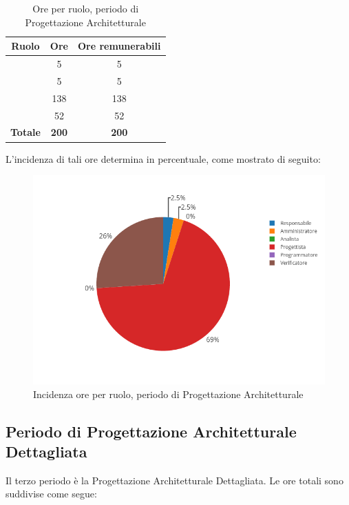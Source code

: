 \begin{table}[H]
	\begin{center}
		\begin{tabular}{|c|c|c|}
			\hline
			\textbf{Ruolo}	& \textbf{Ore}	& \textbf{Ore remunerabili} \\
			\hline
			\Res	&	5	&	5	\\
			\hline
			\Amm	&	5	&	5	\\
			\hline
			\Prog   &	138   &	138	\\
			\hline
			\Ver	&	52	&	52	\\
			\hline
			\textbf{Totale} & \textbf{200} & \textbf{200} \\
			\hline
		\end{tabular}
	\end{center}
	\caption{Ore per ruolo, periodo di Progettazione Architetturale}
\end{table}

L'incidenza di tali ore determina in percentuale, come mostrato di seguito:
\begin{figure}[H]
	\centering
	\includegraphics[scale=0.6]{img/ProgettazioneArchitetturale.png}
	\caption{Incidenza ore per ruolo, periodo di Progettazione Architetturale}
\end{figure}

\subsection{Periodo di Progettazione Architetturale Dettagliata}
Il terzo periodo è la Progettazione Architetturale Dettagliata. Le ore totali sono suddivise come segue:

